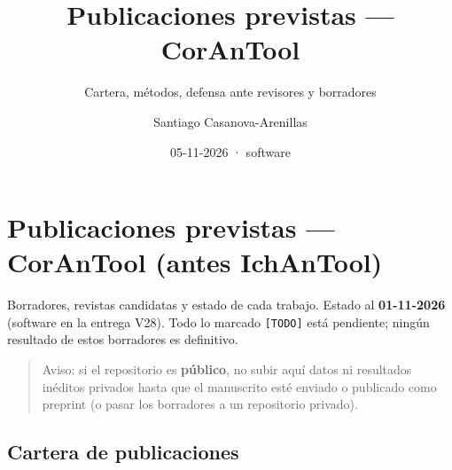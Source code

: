 \documentclass[
  10pt,
]{article}
\title{Publicaciones previstas --- CorAnTool}
\subtitle{Cartera, métodos, defensa ante revisores y borradores}
\author{Santiago Casanova-Arenillas}
\date{05-11-2026 · software}
\begin{document}
\maketitle

{
\hypersetup{linkcolor=}
\setcounter{tocdepth}{2}
\tableofcontents
}
\hypertarget{publicaciones-previstas-corantool-antes-ichantool}{%
\section{Publicaciones previstas --- CorAnTool (antes
IchAnTool)}\label{publicaciones-previstas-corantool-antes-ichantool}}

Borradores, revistas candidatas y estado de cada trabajo. Estado al
\textbf{01-11-2026} (software en la entrega V28). Todo lo marcado
\texttt{{[}TODO{]}} está pendiente; ningún resultado de estos borradores
es definitivo.

\begin{quote}
Aviso: si el repositorio es \textbf{público}, no subir aquí datos ni
resultados inéditos privados hasta que el manuscrito esté enviado o
publicado como preprint (o pasar los borradores a un repositorio
privado).
\end{quote}

\hypertarget{cartera-de-publicaciones}{%
\subsection{Cartera de publicaciones}\label{cartera-de-publicaciones}}
\end{document}
